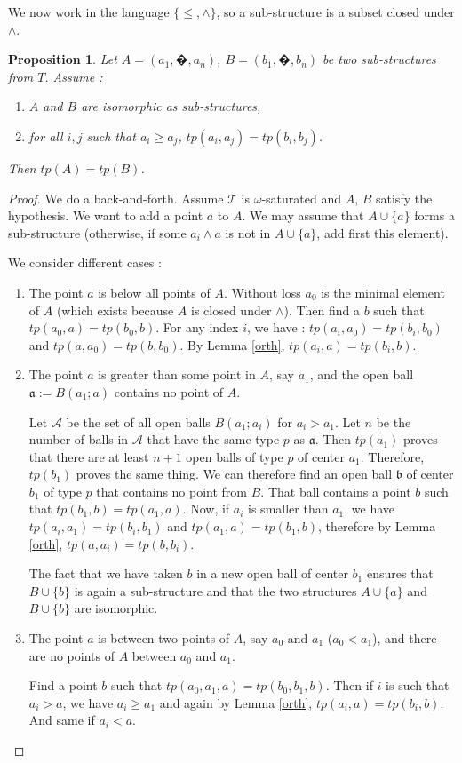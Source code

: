 \documentclass[english]{article}
\newtheorem{prop}[thm]{Proposition}
\theoremstyle{definition}
\theoremstyle{mystyle}
\theoremstyle{remark}
\begin{document}
We now work in the language $\{\leq, \wedge\}$, so a sub-structure is a subset closed under $\wedge$.
\begin{prop}\label{typear}
Let $A=(a_1,�,a_n)$, $B=(b_1,�,b_n)$ be two sub-structures from $T$. Assume :
\begin{enumerate}
\item $A$ and $B$ are isomorphic as sub-structures,
\item for all $i,j$ such that $a_i \geq a_j$, $tp(a_i,a_j) = tp(b_i,b_j)$.
\end{enumerate}
Then $tp(A)=tp(B)$.
\end{prop}
\begin{proof}
We do a back-and-forth. Assume $\mathcal T$ is $\omega$-saturated and $A$, $B$ satisfy the hypothesis. We want to add a point $a$ to $A$. We may assume that $A \cup \{a\}$ forms a sub-structure (otherwise, if some $a_i \wedge a$ is not in $A \cup \{a\}$, add first this element).

We consider different cases :
\begin{enumerate}
\item The point $a$ is below all points of $A$. Without loss $a_0$ is the minimal element of $A$ (which exists because $A$ is closed under $\wedge$). Then find a $b$ such that $tp(a_0,a)=tp(b_0,b)$. For any index $i$, we have : $tp(a_i,a_0)=tp(b_i,b_0)$ and $tp(a,a_0)=tp(b,b_0)$. By Lemma \ref{orth}, $tp(a_i,a)=tp(b_i,b)$.

\item The point $a$ is greater than some point in $A$, say $a_1$, and the open ball $\mathfrak a:=B(a_1;a)$ contains no point of $A$.

Let $\mathcal A$ be the set of all open balls $B(a_1;a_i)$ for $a_i > a_1$. Let $n$ be the number of balls in $\mathcal A$ that have the same type $p$ as $\mathfrak a$. Then $tp(a_1)$ proves that there are at least $n+1$ open balls of type $p$ of center $a_1$. Therefore, $tp(b_1)$ proves the same thing. We can therefore find an open ball $\mathfrak b$ of center $b_1$ of type $p$ that contains no point from $B$. That ball contains a point $b$ such that $tp(b_1,b)=tp(a_1,a)$. Now, if $a_i$ is smaller than $a_1$, we have $tp(a_i,a_1)=tp(b_i,b_1)$ and $tp(a_1,a)=tp(b_1,b)$, therefore by Lemma \ref{orth}, $tp(a,a_i)=tp(b,b_i)$.

The fact that we have taken $b$ in a new open ball of center $b_1$ ensures that $B\cup \{b\}$ is again a sub-structure and that the two structures $A\cup \{a\}$ and $B\cup \{b\}$ are isomorphic.

\item The point $a$ is between two points of $A$, say $a_0$ and $a_1$ ($a_0 < a_1$), and there are no points of $A$ between $a_0$ and $a_1$.

Find a point $b$ such that $tp(a_0,a_1,a)=tp(b_0,b_1,b)$. Then if $i$ is such that $a_i > a$, we have $a_i \geq a_1$ and again by Lemma \ref{orth}, $tp(a_i,a) = tp(b_i,b)$. And same if $a_i < a$.

\end{enumerate}

\end{proof}
\end{document}
